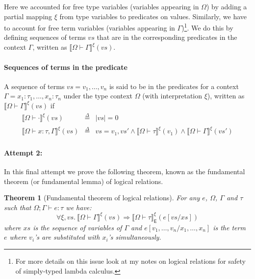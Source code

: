 \documentclass{article}
\newtheorem{theorem}{Theorem}
\newcommand{\EXP}{\mathsf{E}}
\newcommand{\defeq}{\overset{\Delta}{=}}
\newcommand{\semtyp}[2]{\llbracket #2 \rrbracket_{#1}}
\begin{document}
Here we accounted for free type variables (variables appearing
in $\Omega$) by adding a partial
mapping $\xi$ from type variables to predicates on values.
Similarly, we have to account for free term variables (variables
appearing in $\Gamma$)\footnote{For more details on this
issue look at my notes on logical relations for safety of
simply-typed lambda calculus.}.
We do this by defining sequences of terms $\mathit{vs}$
that are in the corresponding predicates in the context
$\Gamma$, written as $\semtyp{}{\Omega \vdash \Gamma}^{\xi}(\mathit{vs})$.

\paragraph{Sequences of terms in the predicate}
A sequence of terms $\mathit{vs} = v_1, \dots,v_n$ is said to be in the predicates for a context
$\Gamma = x_1 : \tau_1,\dots, x_n : \tau_n$ under the type
context $\Omega$ (with interpretation $\xi$), written as $\semtyp{}{\Omega \vdash \Gamma}^{\xi}(vs)$ if
\[
\begin{array}{lll}
\semtyp{}{\Omega \vdash \cdot}^{\xi}(\mathit{vs}) &\defeq&
|\mathit{vs}| = 0\\
\semtyp{}{\Omega \vdash x : \tau, \Gamma}^{\xi}(\mathit{vs})
&\defeq& vs = v_1, \mathit{vs'} \land
\semtyp{}{\Omega \vdash \tau}^{\xi}(v_1) \land
\semtyp{}{\Omega \vdash \Gamma}^{\xi}(\mathit{vs'})
\end{array}
\]

\paragraph{Attempt 2:} In this final attempt we prove the following theorem, known as the fundamental theorem (or fundamental lemma) of logical relations.

\begin{theorem}[Fundamental theorem of logical relations]
For any $e$, $\Omega$, $\Gamma$ and $\tau$ such that $\Omega; \Gamma \vdash e : \tau$ we have:
\[
\forall \xi, \mathit{vs}. ~\semtyp{}{\Omega \vdash \Gamma}^{\xi}(\mathit{vs}) \Rightarrow
\semtyp{\EXP}{\Omega \vdash \tau}^{\xi}(e[\mathit{vs}/\mathit{xs}])
\]
where $\mathit{xs}$ is the sequence of variables of $\Gamma$ and
$e[v_1, \dots, v_n/x_1, \dots, x_n]$ is the term $e$ where $v_i$'s are substituted with $x_i$'s simultaneously.
\end{theorem}
\end{document}

